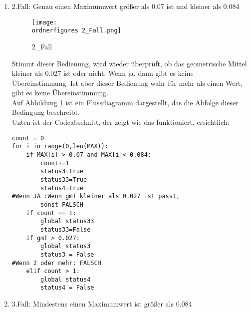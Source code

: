 \begin{enumerate}
\begin{itemize}
\begin{enumerate}
\begin{enumerate}
\begin{lstlisting}
global count
count = 0
for i in range(0,len(MAX)):
	if MAX[i] > 0.06:
		count+=1
		status1=True
		status11=True
		status2=True
		status22=True
				
#Wenn JA: Nur wenn gmT kleiner als 0.01 sind sie richtig,
 sonst FALSCH
	if count ==1:
		global status11
		status11=False
	if count >= 2:
		global status22
	status22=False
	if gmT > 0.01:
	global status1
	status1 = False
				
#Wenn NEIN: gmT muss kleiner als 0.027 sein,
			um RICHTIG zu sein
	else:
		if gmT > 0.027:
			global status2
			status2 = False
\end{lstlisting}
	
			
			\item 2.Fall: Genau einen Maximumwert größer als 0.07 ist und kleiner als 0.084 \\
			
				\begin{figure}[H]
				\centering
				\texttt{[image: \\ordnerfigures 2\_Fall.png]}
				\caption{2\_Fall}
				\label{fig:2_Fall}
			\end{figure}
			
			Stimmt dieser Bedienung, wird wieder überprüft, ob das geometrische Mittel kleiner als 0.027 ist oder nicht. Wenn ja, dann gibt es keine Übereinstimmung. Ist aber dieser Bedienung wahr für mehr als einen Wert, gibt es keine Übereinstimmung. \\
			
			Auf Abbildung \ref{fig:2_Fall} ist ein Flussdiagramm dargestellt, das die Abfolge dieser Bedingung beschreibt.\\
			
			Unten ist der Codeabschnitt, der zeigt wie das funktioniert, ersichtlich:\\
			
\begin{lstlisting}
count = 0
for i in range(0,len(MAX)):
	if MAX[i] > 0.07 and MAX[i]< 0.084:
		count+=1
		status3=True
		status33=True
		status4=True
#Wenn JA :Wenn gmT kleiner als 0.027 ist passt, 
		sonst FALSCH
	if count == 1:
		global status33
		status33=False
	if gmT > 0.027:
		global status3
		status3 = False
#Wenn 2 oder mehr: FALSCH
	elif count > 1:
		global status4
		status4 = False
\end{lstlisting}
			
			\item 3.Fall: Mindestens einen Maximumwert ist größer als 0.084 \\
			

\end{enumerate}
\end{enumerate}
\end{itemize}
\end{enumerate}
